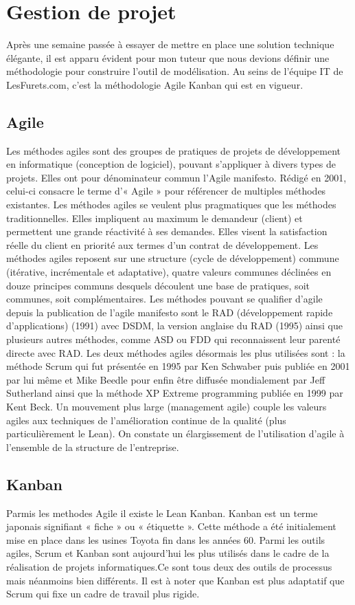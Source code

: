 \chapter{Gestion de projet}

Après une semaine passée à essayer de mettre en place une solution technique élégante, il est apparu évident pour mon tuteur que nous devions définir une méthodologie pour construire l'outil de modélisation. Au seins de l'équipe IT de LesFurets.com, c'est la méthodologie Agile Kanban qui est en vigueur.

\section{Agile}
Les méthodes agiles sont des groupes de pratiques de projets de développement en informatique (conception de logiciel), pouvant s'appliquer à divers types de projets. Elles ont pour dénominateur commun l'Agile manifesto. Rédigé en 2001, celui-ci consacre le terme d'« Agile » pour référencer de multiples méthodes existantes. Les méthodes agiles se veulent plus pragmatiques que les méthodes traditionnelles. Elles impliquent au maximum le demandeur (client) et permettent une grande réactivité à ses demandes. Elles visent la satisfaction réelle du client en priorité aux termes d'un contrat de développement.
Les méthodes agiles reposent sur une structure (cycle de développement) commune (itérative, incrémentale et adaptative), quatre valeurs communes déclinées en douze principes communs desquels découlent une base de pratiques, soit communes, soit complémentaires.
Les méthodes pouvant se qualifier d'agile depuis la publication de l'agile manifesto sont le RAD (développement rapide d'applications) (1991) avec DSDM, la version anglaise du RAD (1995) ainsi que plusieurs autres méthodes, comme ASD ou FDD qui reconnaissent leur parenté directe avec RAD. Les deux méthodes agiles désormais les plus utilisées sont : la méthode Scrum qui fut présentée en 1995 par Ken Schwaber puis publiée en 2001 par lui même et Mike Beedle pour enfin être diffusée mondialement par Jeff Sutherland ainsi que la méthode XP Extreme programming publiée en 1999 par Kent Beck.
Un mouvement plus large (management agile) couple les valeurs agiles aux techniques de l'amélioration continue de la qualité (plus particulièrement le Lean). On constate un élargissement de l'utilisation d'agile à l'ensemble de la structure de l'entreprise.

\section{Kanban}
Parmis les methodes Agile il existe le Lean Kanban.
Kanban est un terme japonais signifiant « fiche » ou « étiquette ».
Cette méthode a été initialement mise en place dans les usines Toyota fin dans les années 60.
Parmi les outils agiles, Scrum et Kanban sont aujourd'hui les plus utilisés dans le cadre de la réalisation de projets informatiques.Ce sont tous deux des outils de processus mais néanmoins bien différents. Il est à noter que Kanban est plus adaptatif que Scrum qui fixe un cadre de travail plus rigide.

